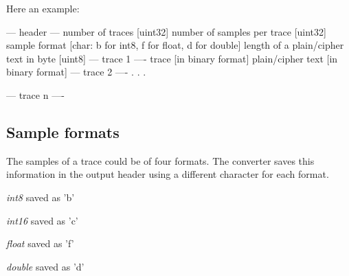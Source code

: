 Here an example: 
\begin{DoxyCode}
--- header ---
number of traces [uint32]
number of samples per trace [uint32]
sample format [char: b for int8, f for float, d for double]
length of a plain/cipher text in byte [uint8]
--- trace 1 ----
trace [in binary format]
plain/cipher text [in binary format]
--- trace 2 ----
.
.
.

--- trace n ----
\end{DoxyCode}
\hypertarget{index_s061}{}\subsection{Sample formats}\label{index_s061}
The samples of a trace could be of four formats. The converter saves this information in the output header using a different character for each format. \begin{DoxyItemize}
\item {\itshape int8\/} saved as 'b' \item {\itshape int16\/} saved as 'c' \item {\itshape float\/} saved as 'f' \item {\itshape double\/} saved as 'd' \end{DoxyItemize}
